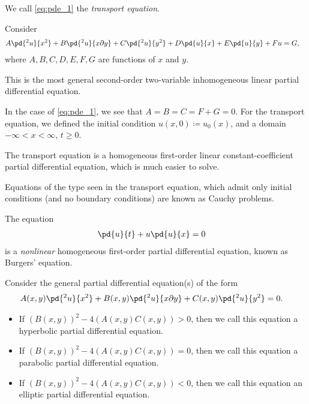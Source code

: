 \documentclass[10pt]{mypackage}
\begin{document}
We call \eqref{eq:pde_1} the \textit{transport equation}.
\begin{example}
  Consider
  \begin{align*}
    A \pd{^2u}{x^2} + B \pd{^2u}{x\partial y} + C \pd{^2u}{y^2} + D \pd{u}{x} + E \pd{u}{y} + F u &= G,
  \end{align*}
  where $A,B,C,D,E,F,G$ are functions of $x$ and $y$.\newline

  This is the most general second-order two-variable inhomogeneous linear partial differential equation.
\end{example}
\begin{example}
  In the case of \eqref{eq:pde_1}, we see that $A = B = C = F + G = 0$. For the transport equation, we defined the initial condition $u\left( x,0 \right) \coloneq u_0\left( x \right)$, and a domain $-\infty < x < \infty$, $t \geq 0$.\newline

  The transport equation is a homogeneous first-order linear constant-coefficient partial differential equation, which is much easier to solve.\newline

  Equations of the type seen in the transport equation, which admit only initial conditions (and no boundary conditions) are known as Cauchy problems.
\end{example}
\begin{example}
  The equation
  \begin{align*}
    \pd{u}{t} + u \pd{u}{x} &= 0
  \end{align*}
  is a \textit{nonlinear} homogeneous first-order partial differential equation, known as Burgers' equation.
\end{example}
\begin{definition}
  Consider the general partial differential equation(s) of the form
  \begin{align*}
    A(x,y) \pd{^2u}{x^2} + B(x,y) \pd{^2u}{x\partial y} + C(x,y)\pd{^2 u}{y^2} &= 0.
  \end{align*}
  \begin{itemize}
    \item If $\left( B(x,y) \right)^2 - 4\left( A\left( x,y \right)C\left( x,y \right) \right) > 0$, then we call this equation a hyperbolic partial differential equation.
    \item If $\left( B(x,y) \right)^2 - 4\left( A\left( x,y \right)C\left( x,y \right) \right) = 0$, then we call this equation a parabolic partial differential equation.
    \item If $\left( B(x,y) \right)^2 - 4\left( A\left( x,y \right)C\left( x,y \right) \right) < 0$, then we call this equation an elliptic partial differential equation.
  \end{itemize}
\end{definition}
\end{document}
